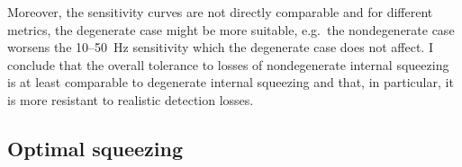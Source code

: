 Moreover, the sensitivity curves are not directly comparable and for different metrics, the degenerate case might be more suitable, e.g.\ the nondegenerate case worsens the 10--50~Hz sensitivity which the degenerate case does not affect. %
I conclude that the overall tolerance to losses of nondegenerate internal squeezing is at least comparable to degenerate internal squeezing and that, in particular, it is more resistant to realistic detection losses.


\subsection{Optimal squeezing}
\label{sec:nIS_optimal_squeezing}


